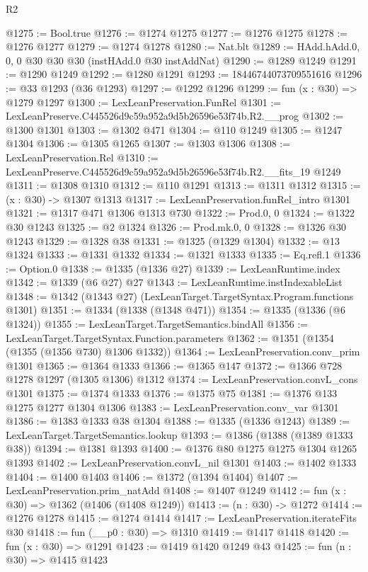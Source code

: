 \begin{lexlean}{R2}
\begin{coremodule}
@1275 := Bool.true
@1276 := @1274 @1275
@1277 := @1276 @1275
@1278 := @1276 @1277
@1279 := @1274 @1278
@1280 := Nat.blt
@1289 := HAdd.hAdd.{0, 0, 0} @30 @30 @30 (instHAdd.{0} @30 instAddNat)
@1290 := @1289 @1249
@1291 := @1290 @1249
@1292 := @1280 @1291
@1293 := 18446744073709551616
@1296 := @33 @1293 (@36 @1293)
@1297 := @1292 @1296
@1299 := fun (x : @30) => @1279 @1297
@1300 := LexLeanPreservation.FunRel
@1301 := LexLeanPreserve.C445526d9c59a952a9d5b26596e53f74b.R2.__prog
@1302 := @1300 @1301
@1303 := @1302 @471
@1304 := @110 @1249
@1305 := @1247 @1304
@1306 := @1305 @1265
@1307 := @1303 @1306
@1308 := LexLeanPreservation.Rel
@1310 := LexLeanPreserve.C445526d9c59a952a9d5b26596e53f74b.R2.__fits_19 @1249
@1311 := @1308 @1310
@1312 := @110 @1291
@1313 := @1311 @1312
@1315 := (x : @30) -> @1307 @1313
@1317 := LexLeanPreservation.funRel_intro @1301
@1321 := @1317 @471 @1306 @1313 @730
@1322 := Prod.{0, 0}
@1324 := @1322 @30 @1243
@1325 := @2 @1324
@1326 := Prod.mk.{0, 0}
@1328 := @1326 @30 @1243
@1329 := @1328 @38
@1331 := @1325 (@1329 @1304)
@1332 := @13 @1324
@1333 := @1331 @1332
@1334 := @1321 @1333
@1335 := Eq.refl.{1}
@1336 := Option.{0}
@1338 := @1335 (@1336 @27)
@1339 := LexLeanRuntime.index
@1342 := @1339 (@6 @27) @27
@1343 := LexLeanRuntime.instIndexableList
@1348 := @1342 (@1343 @27) (LexLeanTarget.TargetSyntax.Program.functions @1301)
@1351 := @1334 (@1338 (@1348 @471))
@1354 := @1335 (@1336 (@6 @1324))
@1355 := LexLeanTarget.TargetSemantics.bindAll
@1356 := LexLeanTarget.TargetSyntax.Function.parameters
@1362 := @1351 (@1354 (@1355 (@1356 @730) @1306 @1332))
@1364 := LexLeanPreservation.conv_prim @1301
@1365 := @1364 @1333
@1366 := @1365 @147
@1372 := @1366 @728 @1278 @1297 (@1305 @1306) @1312
@1374 := LexLeanPreservation.convL_cons @1301
@1375 := @1374 @1333
@1376 := @1375 @75
@1381 := @1376 @133 @1275 @1277 @1304 @1306
@1383 := LexLeanPreservation.conv_var @1301
@1386 := @1383 @1333 @38 @1304
@1388 := @1335 (@1336 @1243)
@1389 := LexLeanTarget.TargetSemantics.lookup
@1393 := @1386 (@1388 (@1389 @1333 @38))
@1394 := @1381 @1393
@1400 := @1376 @80 @1275 @1275 @1304 @1265 @1393
@1402 := LexLeanPreservation.convL_nil @1301
@1403 := @1402 @1333
@1404 := @1400 @1403
@1406 := @1372 (@1394 @1404)
@1407 := LexLeanPreservation.prim_natAdd
@1408 := @1407 @1249
@1412 := fun (x : @30) => @1362 (@1406 (@1408 @1249))
@1413 := (n : @30) -> @1272
@1414 := @1276 @1278
@1415 := @1274 @1414
@1417 := LexLeanPreservation.iterateFits @30
@1418 := fun (__p0 : @30) => @1310
@1419 := @1417 @1418
@1420 := fun (x : @30) => @1291
@1423 := @1419 @1420 @1249 @43
@1425 := fun (n : @30) => @1415 @1423

\end{coremodule}
\end{lexlean}
